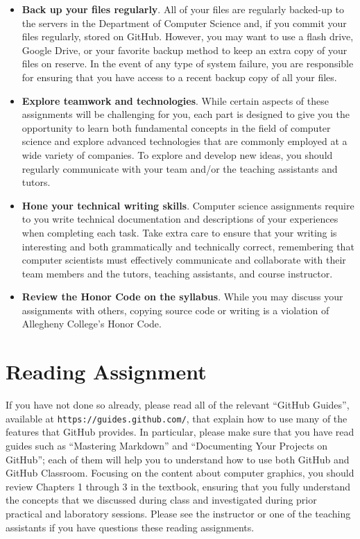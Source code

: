 \documentclass[11pt]{article}
\newcommand{\url}[1]{\lstinline{#1}}
\begin{document}
\begin{itemize}
\item {\bf Back up your files regularly}. All of your files are regularly
  backed-up to the servers in the Department of Computer Science and, if you
  commit your files regularly, stored on GitHub. However, you may want to use a
  flash drive, Google Drive, or your favorite backup method to keep an extra
  copy of your files on reserve. In the event of any type of system failure, you
  are responsible for ensuring that you have access to a recent backup copy of
  all your files.

\item {\bf Explore teamwork and technologies}. While certain aspects of these
  assignments will be challenging for you, each part is designed to give you the
  opportunity to learn both fundamental concepts in the field of computer
  science and explore advanced technologies that are commonly employed at a wide
  variety of companies. To explore and develop new ideas, you should regularly
  communicate with your team and/or the teaching assistants and tutors.

\item {\bf Hone your technical writing skills}. Computer science assignments
  require to you write technical documentation and descriptions of your
  experiences when completing each task. Take extra care to ensure that your
  writing is interesting and both grammatically and technically correct,
  remembering that computer scientists must effectively communicate and
  collaborate with their team members and the tutors, teaching assistants, and
  course instructor.

\item {\bf Review the Honor Code on the syllabus}. While you may discuss your
  assignments with others, copying source code or writing is a violation of
  Allegheny College's Honor Code.

\end{itemize}

\section*{Reading Assignment}

If you have not done so already, please read all of the relevant ``GitHub
Guides'', available at \url{https://guides.github.com/}, that explain how to use
many of the features that GitHub provides. In particular, please make sure that
you have read guides such as ``Mastering Markdown'' and ``Documenting Your
Projects on GitHub''; each of them will help you to understand how to use both
GitHub and GitHub Classroom. Focusing on the content about computer graphics,
you should review Chapters 1 through 3 in the textbook, ensuring that you fully
understand the concepts that we discussed during class and investigated during
prior practical and laboratory sessions. Please see the instructor or one of the
teaching assistants if you have questions these reading assignments.
\end{document}
